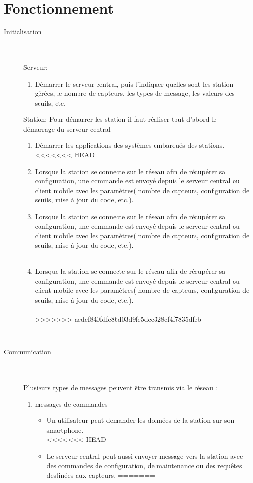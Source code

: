 \documentclass [a4paper] {report}
\begin{document}
\section{Fonctionnement}

\begin{description}

\item[Initialisation]\hfill\\
	\\Serveur:
	\begin{enumerate}
	\item Démarrer le serveur central, puis l'indiquer quelles sont les station gérées, le nombre de capteurs, les types de message, les valeurs des seuils, etc.\\
	\end{enumerate}
	Station: 
	Pour démarrer les station il faut réaliser tout d'abord le démarrage du serveur central
	\begin{enumerate}
	\item Démarrer les applications des systèmes embarqués des stations.
<<<<<<< HEAD
	\item Lorsque la station se connecte sur le réseau afin de récupérer sa configuration, une commande est envoyé depuis le serveur central ou client mobile avec les paramètres( nombre de capteurs, configuration de seuils, mise à jour du code, etc.).
=======
	\item Lorsque la station se connecte sur le réseau afin de récupérer sa configuration, une commande est envoyé 
	depuis le serveur central ou client mobile avec les paramètres( nombre de capteurs, configuration de seuils, mise à jour du code, etc.).\\\\
	\item Lorsque la station se connecte sur le réseau afin de récupérer sa configuration, une commande est envoyé depuis le serveur central ou client mobile avec les paramètres( nombre de capteurs, configuration de seuils, mise à jour du code, etc.).\\\\
>>>>>>> aedcf840fdfe86d03d9fe5dcc328cf4f7835dfeb
	\end{enumerate}
\hfill\\
\item [Communication]\hfill\\
	\\Plusieurs types de messages peuvent être transmis via le réseau :\\
	\begin{enumerate}
	\item messages de commandes \\
		\begin{itemize}
		\item Un utilisateur peut demander les données de la station sur son smartphone.\\
<<<<<<< HEAD
		\item Le serveur central peut aussi envoyer message vers la station avec des commandes de configuration, de maintenance ou des requêtes destinées aux capteurs.
=======


\end{itemize}
\end{enumerate}
\end{description}
\end{document}
